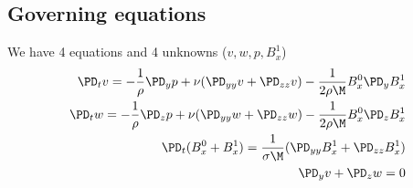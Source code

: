 \documentclass[11pt]{article}
\begin{document}
\subsection{Governing equations}
We have 4 equations and 4 unknowns ($v,w,p,B_x^1$)
\begin{equation}\begin{aligned}
\PD_t v = -\frac{1}{\rho} \PD_y p + \nu (\PD_{yy} v+\PD_{zz} v) - \frac{1}{2\rho \M} B_x^0 \PD_y B_x^1 \\
\PD_t w = -\frac{1}{\rho} \PD_z p + \nu (\PD_{yy} w+\PD_{zz} w) - \frac{1}{2\rho \M} B_x^0 \PD_z B_x^1 \\
\PD_t (B_x^0+B_x^1) = \frac{1}{\sigma \M} (\PD_{yy} B_x^1+\PD_{zz} B_x^1) \\
\PD_y v + \PD_z w = 0 \\
\end{aligned} \end{equation}
\end{document}
